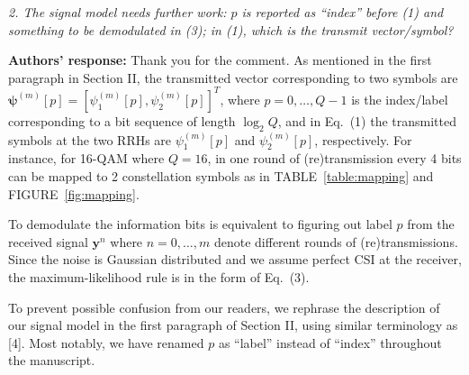 \documentclass[onecolumn, 11pt, draftclsnofoot]{IEEEtran}
\begin{document}
\vspace{0.5cm}

\noindent
\emph{2. The signal model needs further work: $p$ is reported as “index” before
(1) and something to be demodulated in (3); in (1), which is the transmit
vector/symbol? }

\noindent \textbf{Authors' response:}
Thank you for the comment. As mentioned in the first paragraph in Section
II, the transmitted vector corresponding to two symbols are
$\bm{\psi}^{(m)}[p] = [\psi_1^{(m)}[p], \psi_2^{(m)}[p]]^T$, where
$p=0,\ldots,Q-1$ is the index/label corresponding to a bit sequence of length
$\log_2Q$, and in Eq.~(1) the transmitted symbols at the two RRHs are
$\psi_1^{(m)}[p]$ and $\psi_2^{(m)}[p]$, respectively. For instance, for 16-QAM where $Q=16$, in
one round of (re)transmission every 4 bits can be mapped to 2 constellation
symbols as in TABLE~\ref{table:mapping} and FIGURE~\ref{fig:mapping}.

To demodulate the information bits is equivalent to figuring out label $p$ from
the received signal $\mathbf{y}^{n}$ where $n=0,\ldots,m$ denote different
rounds of (re)transmissions. Since the noise is Gaussian distributed and we
assume perfect CSI at the receiver, the maximum-likelihood rule is in the form
of Eq.~(3).

To prevent possible confusion from our readers, we rephrase the description of
our signal model in the first paragraph of Section II, using similar
terminology as [4]. Most notably, we have renamed $p$ as ``label'' instead of
``index'' throughout the manuscript.
\end{document}
